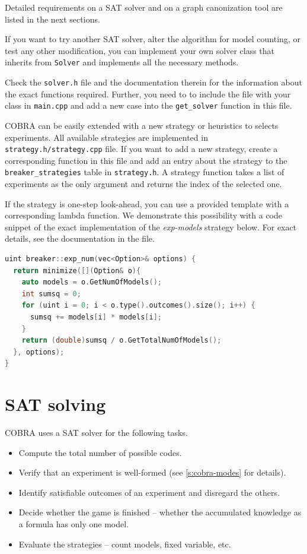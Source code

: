 Detailed requirements on a SAT solver and
  on a graph canonization tool are listed in the next sections.

If you want to try another SAT solver, alter the algorithm for model counting,
  or test any other modification,
  you can implement your own solver class that inherits from \texttt{Solver} and
  implements all the necessary methods.

Check the \texttt{solver.h} file and the documentation therein
  for the information about the exact functions required.
Further, you need to to include the file with your class in
  \texttt{main.cpp} and add a new case
  into the \texttt{get\_solver} function in this file.


COBRA can be easily extended with a new strategy or heuristics to selects experiments.
All available strategies are implemented in \texttt{strategy.h/strategy.cpp} file.
If you want to add a new strategy, create a corresponding function in this file
  and add an entry about the strategy
  to the \texttt{breaker\_strategies} table in \texttt{strategy.h}.
A strategy function takes a list of experiments as the only argument
  and returns the index of the selected one.

If the strategy is one-step look-ahead,
  you can use a provided template with a corresponding lambda function.
We demonstrate this possibility with a code snippet of
  the exact implementation of the \emph{exp-models} strategy below.
For exact details, see the documentation in the file.

\begin{lstlisting}[language=C++]
uint breaker::exp_num(vec<Option>& options) {
  return minimize([](Option& o){
    auto models = o.GetNumOfModels();
    int sumsq = 0;
    for (uint i = 0; i < o.type().outcomes().size(); i++) {
      sumsq += models[i] * models[i];
    }
    return (double)sumsq / o.GetTotalNumOfModels();
  }, options);
}
\end{lstlisting}

\section{SAT solving} \label{s:cobra-sat}

COBRA uses a SAT solver for the following tasks.
\begin{itemize}
\item Compute the total number of possible codes.
\item Verify that an experiment is well-formed (see \autoref{s:cobra-modes} for details).
\item Identify satisfiable outcomes of an experiment and disregard the others.
\item Decide whether the game is finished -- whether the accumulated
  knowledge as a formula has only one model.
\item Evaluate the strategies -- count models, fixed variable, etc.
\end{itemize}


